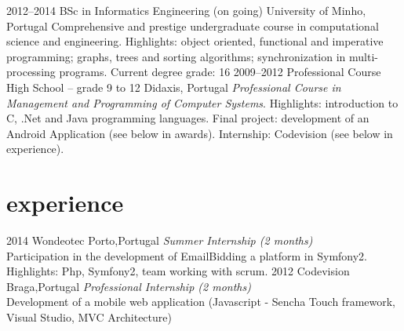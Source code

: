 \documentclass[]{friggeri-cv} %
\begin{document}
\begin{entrylist}
\entry
{2012--2014}
{BSc in Informatics Engineering  {\normalfont (on going) }}
{University of Minho, Portugal}
{Comprehensive and prestige undergraduate course in computational science and engineering. Highlights: object oriented, functional and imperative programming; graphs, trees and sorting algorithms; synchronization in multi-processing programs. Current degree grade: 16 }
\entry
{2009--2012}
{Professional Course {\normalfont High School – grade 9 to 12}}
{Didaxis, Portugal}
{\emph{Professional Course in Management and Programming of Computer Systems}. Highlights: introduction to C, .Net and Java programming languages. Final project: development of an Android Application (see below in awards). Internship: Codevision (see below in experience).}


\end{entrylist}






\section{experience}

\begin{entrylist}
\entry
{2014}
{Wondeotec}
{Porto,Portugal}
{\emph{Summer Internship (2 months)} \\
Participation in the development of EmailBidding a platform in Symfony2. Highlights: Php, Symfony2, team working with scrum.
}
{2012}
{Codevision}
{Braga,Portugal}
{\emph{Professional Internship (2 months)} \\
Development of a mobile web application (Javascript - Sencha Touch framework, Visual Studio, MVC Architecture) 
}
\end{entrylist}





\end{document}

